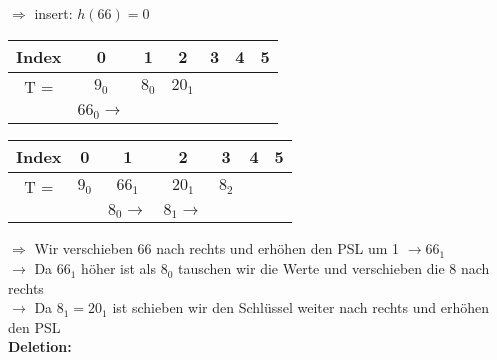 \newpage
$\Rightarrow$ insert: $h(66)=0$
\begin{multicols}{2}
\begin{center}
\begin{tabular}{|c|c|c|c|c|c|c|}
\hline
Index & 0 & 1 & 2 & 3 & 4 & 5\\
\hline
T = & $9_0$ & $8_0$ & $20_1$ & & &\\
\hline
& $66_0 \rightarrow$ &  & & & &\\
\hline
\end{tabular}
\end{center}


\columnbreak
\begin{center}
\begin{tabular}{|c|c|c|c|c|c|c|}
\hline
Index & 0 & 1 & 2 & 3 & 4 & 5\\
\hline
T = & $9_0$ & $66_1$ & $20_1$ & $8_2$ & &\\
\hline
&  & $8_0 \rightarrow$ & $8_1 \rightarrow$ & & &\\
\hline
\end{tabular}
\end{center}
\end{multicols}
$\Rightarrow$ Wir verschieben $66$ nach rechts und erhöhen den PSL um 1 $\rightarrow 66_1$\\
$\rightarrow$ Da $66_1$ höher ist als $8_0$ tauschen wir die Werte und verschieben die 8 nach rechts\\
$\rightarrow$ Da $8_1 = 20_1$ ist schieben wir den Schlüssel weiter nach rechts und erhöhen den PSL\\


\setlength{\columnseprule}{1pt}
\noindent
\textbf{Deletion:}\\

